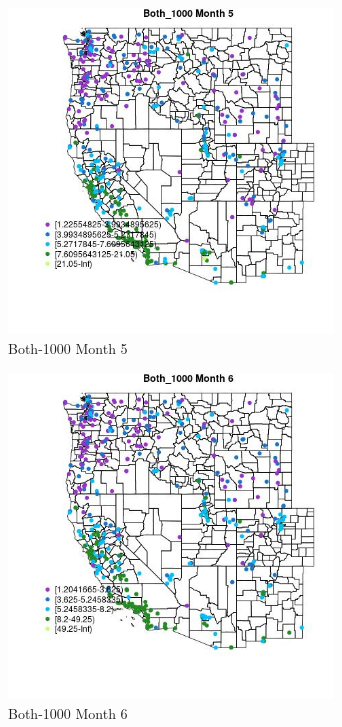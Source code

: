 \begin{figure} 
\centering  
\includegraphics[width=0.77\textwidth]{Code_Outputs/ML_input_report_ML_input_PM25_Step5_part_d_de_duplicated_aves_ML_input_MapObsMo5Both_1000.jpg} 
\caption{\label{fig:ML_input_report_ML_input_PM25_Step5_part_d_de_duplicated_aves_ML_inputMapObsMo5Both_1000}Both-1000 Month 5} 
\end{figure} 
 

\clearpage 

\begin{figure} 
\centering  
\includegraphics[width=0.77\textwidth]{Code_Outputs/ML_input_report_ML_input_PM25_Step5_part_d_de_duplicated_aves_ML_input_MapObsMo6Both_1000.jpg} 
\caption{\label{fig:ML_input_report_ML_input_PM25_Step5_part_d_de_duplicated_aves_ML_inputMapObsMo6Both_1000}Both-1000 Month 6} 
\end{figure} 
 

